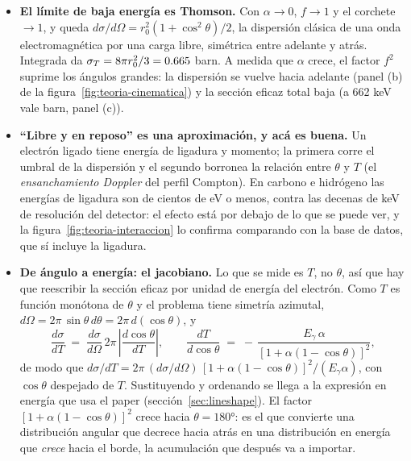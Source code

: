 \documentclass[11pt,a4paper]{article}
\begin{document}
\begin{itemize}
\item \textbf{El límite de baja energía es Thomson.} Con $\alpha \to 0$,
      $f \to 1$ y el corchete $\to 1$, y queda
      $d\sigma/d\Omega = r_0^2(1+\cos^2\theta)/2$, la dispersión clásica de
      una onda electromagnética por una carga libre, simétrica entre adelante
      y atrás. Integrada da $\sigma_T = 8\pi r_0^2/3 = 0.665$ barn.
      A medida que $\alpha$ crece, el factor $f^2$ suprime los ángulos
      grandes: la dispersión se vuelve hacia adelante (panel (b) de la
      figura~\ref{fig:teoria-cinematica}) y la sección eficaz total baja (a
      662 keV vale \SigmaKNCs{} barn, panel (c)).
\item \textbf{``Libre y en reposo'' es una aproximación, y acá es buena.} Un
      electrón ligado tiene energía de ligadura y momento; la primera corre
      el umbral de la dispersión y el segundo borronea la relación entre
      $\theta$ y $T$ (el \emph{ensanchamiento Doppler} del perfil Compton).
      En carbono e hidrógeno las energías de ligadura son de cientos de eV o
      menos, contra las decenas de keV de resolución del detector: el efecto
      está por debajo de lo que se puede ver, y la
      figura~\ref{fig:teoria-interaccion} lo confirma comparando con la base
      de datos, que sí incluye la ligadura.
\item \textbf{De ángulo a energía: el jacobiano.} Lo que se mide es $T$, no
      $\theta$, así que hay que reescribir la sección eficaz por unidad de
      energía del electrón. Como $T$ es función monótona de $\theta$ y el
      problema tiene simetría azimutal, $d\Omega = 2\pi\,\sin\theta\,d\theta =
      2\pi\,d(\cos\theta)$, y
      \[
         \frac{d\sigma}{dT} \;=\; \frac{d\sigma}{d\Omega}\,
         2\pi\,\left|\frac{d\cos\theta}{dT}\right|,
         \qquad
         \frac{dT}{d\cos\theta} \;=\; -\,\frac{E_\gamma\,\alpha}
                                            {[1 + \alpha(1-\cos\theta)]^2},
      \]
      de modo que $d\sigma/dT = 2\pi\,(d\sigma/d\Omega)\,
      [1+\alpha(1-\cos\theta)]^2/(E_\gamma\alpha)$, con $\cos\theta$
      despejado de $T$. Sustituyendo y ordenando se llega a la expresión en
      energía que usa el paper (sección~\ref{sec:lineshape}). El factor
      $[1+\alpha(1-\cos\theta)]^2$ crece hacia $\theta = 180°$: es el que
      convierte una distribución angular que decrece hacia atrás en una
      distribución en energía que \emph{crece} hacia el borde, la
      acumulación que después va a importar.
\end{itemize}
\end{document}
